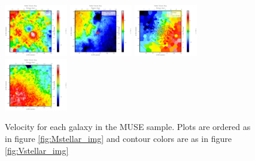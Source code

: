 \begin{figure}
      \centering
      \includegraphics[width=0.245\textwidth]{Mmaps/ic1459_stellar_vel.png}
      \includegraphics[width=0.245\textwidth]{Mmaps/ngc1316_stellar_vel.png}
      \includegraphics[width=0.245\textwidth]{Mmaps/ic4296_stellar_vel.png}
      \includegraphics[width=0.245\textwidth]{Mmaps/ngc1399_stellar_vel.png}
      \caption[MUSE velocity maps]{Velocity for each galaxy in the MUSE sample. Plots are ordered as in figure \ref{fig:Mstellar_img} and contour colors are as in figure \ref{fig:Vstellar_img}}
      \label{fig:stellar_vel}
\end{figure}

